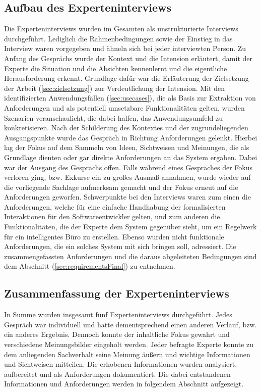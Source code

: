 \subsection{Aufbau des Experteninterviews}
    Die Experteninterviews wurden im Gesamten als unstrukturierte Interviews durchgeführt. Lediglich die Rahmenbedingungen sowie 
    der Einstieg in das Interview waren vorgegeben und ähneln sich bei jeder interviewten Person. Zu Anfang des Gesprächs wurde 
    der Kontext und die Intension erläutert, damit der Experte die Situation und die Absichten kennenlernt und die 
    eigentliche Herausforderung 
    erkennt. Grundlage dafür war die Erläuterung der Zielsetzung der Arbeit (\ref{sec:zielsetzung}) zur Verdeutlichung der 
    Intension. Mit den identifizierten Anwendungsfällen (\ref{sec:usecases}), die als Basis 
    zur Extraktion von Anforderungen und als potentiell umsetzbare Funktionalitäten gelten, wurden Szenarien veranschaulicht, 
    die dabei halfen, das Anwendungsumfeld zu konkretisieren.  
    Nach der Schilderung des Kontextes und der zugrundeliegenden Ausgangspunkte wurde das Gespräch in Richtung Anforderungen 
    gelenkt. Hierbei lag der Fokus auf dem Sammeln von Ideen, Sichtweisen und Meinungen, die als Grundlage 
    dienten oder gar direkte Anforderungen an das System ergaben. Dabei war der Ausgang des Gesprächs offen. Falls während 
    eines Gespräches der Fokus verloren ging, bzw. Exkurse ein zu großes Ausmaß annahmen, wurde wieder auf die 
    vorliegende Sachlage aufmerksam gemacht und der Fokus erneut auf die Anforderungen geworfen. 
    Schwerpunkte bei den Interviews waren zum einen die Anforderungen, welche für eine einfache Handhabung der 
    formalisierten Interaktionen für den Softwareentwickler gelten, und zum anderen die Funktionalitäten, die der 
    Experte dem System gegenüber sieht, um ein Regelwerk für ein intelligentes Büro zu erstellen. 
    Ebenso wurden nicht funktionale Anforderungen, die ein solches System mit sich bringen soll, adressiert. 
    Die zusammengefassten Anforderungen und die daraus abgeleiteten Bedingungen sind dem Abschnitt (\ref{sec:requirementsFinal}) 
    zu entnehmen.
     
\subsection{Zusammenfassung der Experteninterviews}
    In Summe wurden insgesamt fünf Experteninterviews durchgeführt. Jedes Gespräch war individuell und hatte dementsprechend 
    einen anderen Verlauf, bzw. ein anderes Ergebnis. Dennoch konnte der inhaltliche Fokus gewahrt und verschiedene 
    Meinungsbilder eingeholt werden. Jeder befragte Experte konnte zu dem anliegenden Sachverhalt seine Meinung äußern und 
    wichtige Informationen und Sichtweisen mitteilen. Die erhobenen Informationen wurden analysiert, aufbereitet und 
    als Anforderungen dokumentiert. Die dabei entstandenen Informationen und Anforderungen werden in 
    folgendem Abschnitt aufgezeigt. 
    
